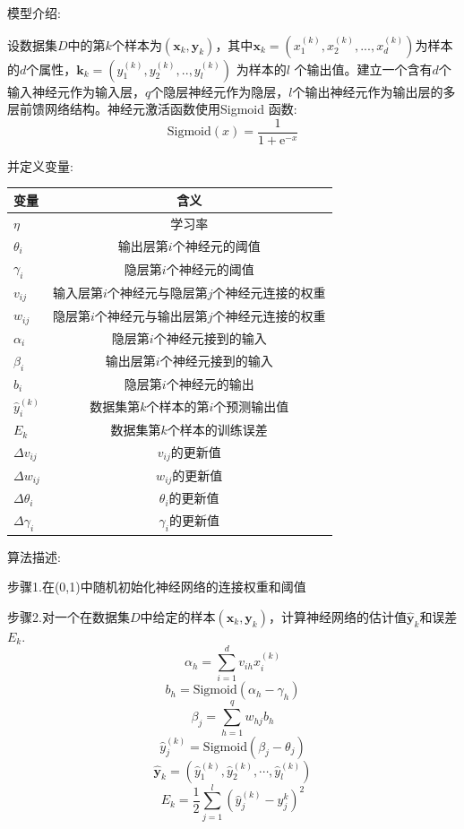 \documentclass{ctexart}
\begin{document}
模型介绍:

设数据集$D$中的第$k$个样本为$(\bm{x}_{k},\bm{y}_{k})$，其中$\bm{x}_{k}=(x^{(k)}_{1},x^{(k)}_{2},...,x^{(k)}_{d})$为样本的$d$个属性，$\bm{k}_{k}=(y^{(k)}_{1},y^{(k)}_{2},..,y^{(k)}_{l})$ 为样本的$l$ 个输出值。建立一个含有$d$个输入神经元作为输入层，$q$个隐层神经元作为隐层，$l$个输出神经元作为输出层的多层前馈网络结构。神经元激活函数使用Sigmoid 函数:$$\mathrm{Sigmoid}(x)=\frac{1}{1+\mathrm{e}^{-x}}$$

并定义变量:

  \begin{table}[!h]\center\small
\begin{tabular}{|l|c|}
\hline
变量&含义\\
\hline
$\eta$ &学习率\\
\hline
$\theta_{i}$     &     输出层第$i$个神经元的阈值\\
\hline
 $\gamma_{i}$       &    隐层第$i$个神经元的阈值\\
\hline
$v_{ij}$&                 输入层第$i$个神经元与隐层第$j$个神经元连接的权重\\
\hline
$w_{ij}$&                 隐层第$i$个神经元与输出层第$j$个神经元连接的权重\\
\hline
$\alpha_{i}$&                 隐层第$i$个神经元接到的输入\\
\hline
$\beta_{i}$&                 输出层第$i$个神经元接到的输入\\
\hline
$b_{i}$&                 隐层第$i$个神经元的输出\\
\hline
$\hat{y}^{(k)}_{i}$&    数据集第$k$个样本的第$i$个预测输出值\\
\hline
$E_{k}$&                 数据集第$k$个样本的训练误差\\
\hline
$\Delta v_{ij}$&                 $v_{ij}$的更新值\\
\hline
$\Delta w_{ij}$&                 $w_{ij}$的更新值\\
\hline
$\Delta \theta_{i}$&                 $\theta_{i}$的更新值\\
\hline
$\Delta \gamma_{i}$&                 $\gamma_{i}$的更新值\\
\hline
\end{tabular}
\end{table}


算法描述:

步骤1.在(0,1)中随机初始化神经网络的连接权重和阈值

步骤2.对一个在数据集$D$中给定的样本$(\bm{x}_{k},\bm{y}_{k})$，计算神经网络的估计值$\hat{\bm{y}}_{k}$和误差$E_{k}$.
$$\alpha_{h}=\sum_{i=1}^{d}v_{ih}x^{(k)}_{i}$$
$$b_{h}=\mathrm{Sigmoid}(\alpha_{h}-\gamma_{h})$$
$$\beta_{j}=\sum_{h=1}^{q}w_{hj}b_{h}$$
$$\hat{y}_{j}^{(k)}=\mathrm{Sigmoid}(\beta_{j}-\theta_{j})$$
$$\hat{\bm{y}}_{k}=(\hat{y}_{1}^{(k)},\hat{y}_{2}^{(k)},\cdots,\hat{y}_{l}^{(k)})$$
$$E_{k}=\frac{1}{2}\sum_{j=1}^{l}(\hat{y}_{j}^{(k)}-y_{j}^{k})^{2}$$
\end{document}
